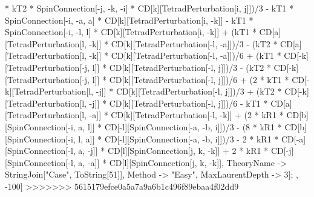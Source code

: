 * kT2 * SpinConnection[-j, -k, -i] * CD[k][TetradPerturbation[i, j]])/3 - kT1 * SpinConnection[-i, -a, a] * CD[k][TetradPerturbation[i, -k]] - kT1 * SpinConnection[-i, -l, l] * CD[k][TetradPerturbation[i, -k]] + (kT1 * CD[a][TetradPerturbation[l, -k]] * CD[k][TetradPerturbation[-l, -a]])/3 - (kT2 * CD[a][TetradPerturbation[l, -k]] * CD[k][TetradPerturbation[-l, -a]])/6 + (kT1 * CD[-k][TetradPerturbation[-j, l]] * CD[k][TetradPerturbation[-l, j]])/3 - (kT2 * CD[-k][TetradPerturbation[-j, l]] * CD[k][TetradPerturbation[-l, j]])/6 + (2 * kT1 * CD[-k][TetradPerturbation[l, -j]] * CD[k][TetradPerturbation[-l, j]])/3 + (kT2 * CD[-k][TetradPerturbation[l, -j]] * CD[k][TetradPerturbation[-l, j]])/6 - kT1 * CD[a][TetradPerturbation[l, -a]] * CD[k][TetradPerturbation[-l, -k]] + (2 * kR1 * CD[b][SpinConnection[-i, a, l]] * CD[-l][SpinConnection[-a, -b, i]])/3 - (8 * kR1 * CD[b][SpinConnection[-i, l, a]] * CD[-l][SpinConnection[-a, -b, i]])/3 - 2 * kR1 * CD[-a][SpinConnection[-l, a, -j]] * CD[l][SpinConnection[j, k, -k]] + 2 * kR1 * CD[-j][SpinConnection[-l, a, -a]] * CD[l][SpinConnection[j, k, -k]], TheoryName -> StringJoin["Case", ToString[51]], Method -> "Easy", MaxLaurentDepth -> 3]; , -100]
>>>>>>> 5615179efce0a5a7a9a6b1c496f89ebaa4f02dd9
